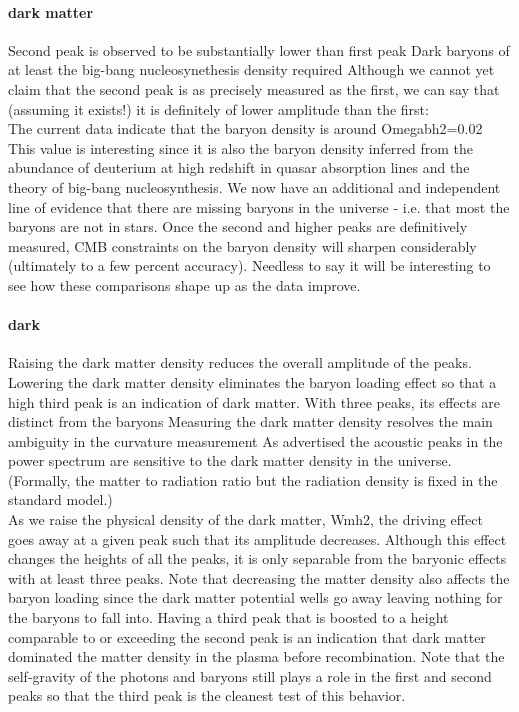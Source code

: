 \documentclass{article}
\begin{document}
\paragraph{dark matter}
Second peak is observed to be substantially lower than first peak
Dark baryons of at least the big-bang nucleosynethesis density required
Although we cannot yet claim that the second peak is as precisely measured as the first, we can say that (assuming it exists!) it is definitely of lower amplitude than the first:\\
The current data indicate that the baryon density is around Omegabh2=0.02 This value is interesting since it is also the baryon density inferred from the abundance of deuterium at high redshift in quasar absorption lines and the theory of big-bang nucleosynthesis.  We now have an additional and independent line of evidence that there are missing baryons in the universe - i.e. that most the baryons are not in stars.   Once the second and higher peaks are definitively measured, CMB constraints on the baryon density will sharpen considerably (ultimately to a few percent accuracy).  Needless to say it will be interesting to see how these comparisons shape up as the data improve.
\paragraph{dark}
Raising the dark matter density reduces the overall amplitude of the peaks.
Lowering the dark matter density eliminates the baryon loading effect so that a high third peak is an indication of dark matter.
With three peaks, its effects are distinct from the baryons
Measuring the dark matter density resolves the main ambiguity in the curvature measurement
As advertised the acoustic peaks in the power spectrum are sensitive to the dark matter density in the universe.  (Formally, the matter to radiation ratio but the radiation density is fixed in the standard model.)\\
As we raise the physical density of the dark matter, Wmh2, the driving effect goes away at a given peak such that its amplitude decreases.  Although this effect changes the heights of all the peaks, it is only separable from the baryonic effects with at least three peaks.  Note that decreasing the matter density also affects the baryon loading since the dark matter potential wells go away leaving nothing for the baryons to fall into. Having a third peak that is boosted to a height comparable to or exceeding the second peak is an indication that dark matter dominated the matter density in the plasma before recombination. Note that the self-gravity of the photons and baryons still plays a role in the first and second peaks so that the third peak is the cleanest test of this behavior.
\end{document}

